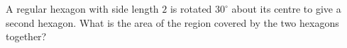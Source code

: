 A regular hexagon with side length $2$ is rotated $30^\circ$ about its centre to give a second hexagon. What is the area of the region covered by the two hexagons together?
